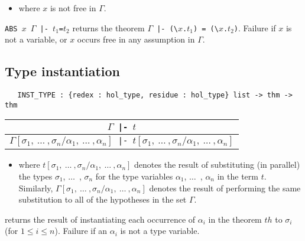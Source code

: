\begin{itemize}
\item where $x$ is not free in $\Gamma$.
\end{itemize}

\noindent
{\small\verb+ABS +}$x${\small\verb+ +}$\Gamma${\small\verb+ |- +}$t_1${\small\verb+=+}$t_2$ returns the theorem
$\Gamma${\small\verb+ |- (\+}$x${\small\verb+.+}$t_1${\small\verb+) = (\+}$x${\small\verb+.+}$t_2${\small\verb+)+}.
Failure if $x$ is not a variable, or $x$
 occurs free in any assumption in $\Gamma$.


\bigskip

\subsection{Type instantiation}

\begin{holboxed}
\begin{verbatim}
   INST_TYPE : {redex : hol_type, residue : hol_type} list -> thm -> thm
\end{verbatim}
\end{holboxed}

\begin{center}
\begin{tabular}{c}
$\Gamma${\small\verb+ |- +}$t$ \\ \hline
$\Gamma[\sigma_1,\ \ldots\ ,\sigma_n/\alpha_1,\ \ldots\ ,\alpha_n]${\small\verb+ |- +}$t[\sigma_1,\ \ldots\ ,\sigma_n/\alpha_1,\ \ldots\ ,\alpha_n]$
\end{tabular}
\end{center}

\bigskip

\begin{itemize}
\item where $t[\sigma_1,\ \ldots\ ,\sigma_n/\alpha_1,\ \ldots\ ,\alpha_n]$
denotes the result of substituting (in parallel) the types $\sigma_1$,
$\ldots$\ , $\sigma_n$ for the type variables $\alpha_1$, $\ldots$\ ,
$\alpha_n$ in the term $t$.  Similarly, $\Gamma[\sigma_1,\ \ldots\
,\sigma_n/\alpha_1,\ \ldots\ ,\alpha_n]$ denotes the result of
performing the same substitution to all of the hypotheses in the set
$\Gamma$.
\end{itemize}

\noindent
{} returns the result of
instantiating each occurrence of $\alpha_i$ in the theorem $th$ to
$\sigma_i$ (for $1 \leq i \leq n$). Failure if an $\alpha_i$ is
not a type variable.

